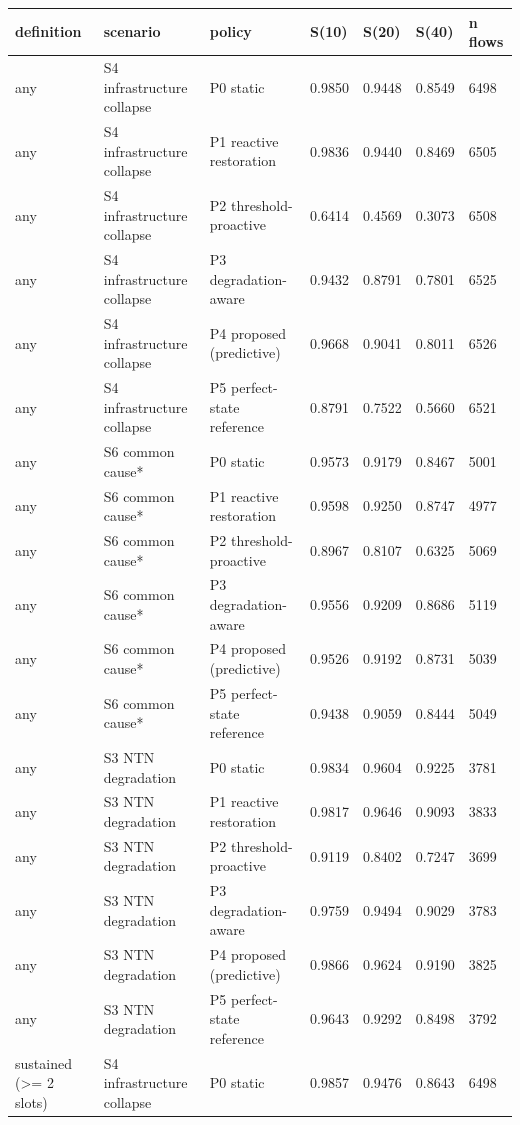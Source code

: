 \begin{tabular}{lllllll}
\toprule
definition & scenario & policy & S(10) & S(20) & S(40) & n flows \\
\midrule
any & S4 infrastructure collapse & P0 static & 0.9850 & 0.9448 & 0.8549 & 6498 \\
any & S4 infrastructure collapse & P1 reactive restoration & 0.9836 & 0.9440 & 0.8469 & 6505 \\
any & S4 infrastructure collapse & P2 threshold-proactive & 0.6414 & 0.4569 & 0.3073 & 6508 \\
any & S4 infrastructure collapse & P3 degradation-aware & 0.9432 & 0.8791 & 0.7801 & 6525 \\
any & S4 infrastructure collapse & P4 proposed (predictive) & 0.9668 & 0.9041 & 0.8011 & 6526 \\
any & S4 infrastructure collapse & P5 perfect-state reference & 0.8791 & 0.7522 & 0.5660 & 6521 \\
any & S6 common cause* & P0 static & 0.9573 & 0.9179 & 0.8467 & 5001 \\
any & S6 common cause* & P1 reactive restoration & 0.9598 & 0.9250 & 0.8747 & 4977 \\
any & S6 common cause* & P2 threshold-proactive & 0.8967 & 0.8107 & 0.6325 & 5069 \\
any & S6 common cause* & P3 degradation-aware & 0.9556 & 0.9209 & 0.8686 & 5119 \\
any & S6 common cause* & P4 proposed (predictive) & 0.9526 & 0.9192 & 0.8731 & 5039 \\
any & S6 common cause* & P5 perfect-state reference & 0.9438 & 0.9059 & 0.8444 & 5049 \\
any & S3 NTN degradation & P0 static & 0.9834 & 0.9604 & 0.9225 & 3781 \\
any & S3 NTN degradation & P1 reactive restoration & 0.9817 & 0.9646 & 0.9093 & 3833 \\
any & S3 NTN degradation & P2 threshold-proactive & 0.9119 & 0.8402 & 0.7247 & 3699 \\
any & S3 NTN degradation & P3 degradation-aware & 0.9759 & 0.9494 & 0.9029 & 3783 \\
any & S3 NTN degradation & P4 proposed (predictive) & 0.9866 & 0.9624 & 0.9190 & 3825 \\
any & S3 NTN degradation & P5 perfect-state reference & 0.9643 & 0.9292 & 0.8498 & 3792 \\
sustained (>= 2 slots) & S4 infrastructure collapse & P0 static & 0.9857 & 0.9476 & 0.8643 & 6498 \\

\end{tabular}
